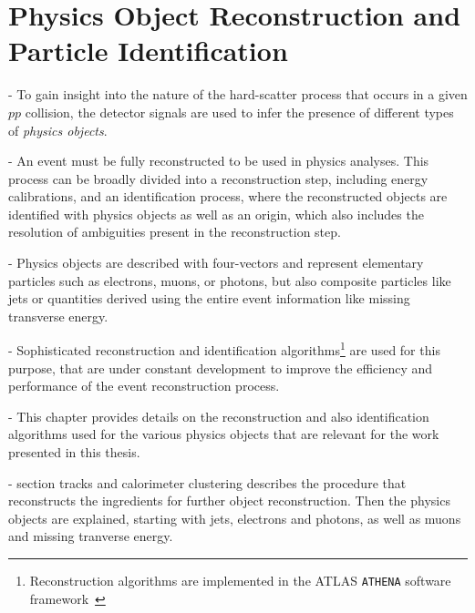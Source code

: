 
\chapter{Physics Object Reconstruction and Particle Identification}
\label{chap:objects}

- To gain insight into the nature of the hard-scatter process that occurs in a given $pp$ collision, the detector signals are used to infer the presence of different types of \emph{physics objects}.

- An event must be fully reconstructed to be used in physics analyses. This process can be broadly divided into a reconstruction step, including energy calibrations, and an identification process, where the reconstructed objects are identified with physics objects as well as an origin, which also includes the resolution of ambiguities present in the reconstruction step.

- Physics objects are described with four-vectors and represent elementary particles such as electrons, muons, or photons, but also composite particles like jets or quantities derived using the entire event information like missing transverse energy.

- Sophisticated reconstruction and identification algorithms\footnote{Reconstruction algorithms are implemented in the ATLAS \texttt{ATHENA} software framework~\cite{ATLAS-TDR-17}} are used for this purpose, that are under constant development to improve the efficiency and performance of the event reconstruction process.

- This chapter provides details on the reconstruction and also identification algorithms used for the various physics objects that are relevant for the work presented in this thesis.

- section tracks and calorimeter clustering describes the procedure that reconstructs the ingredients for further object reconstruction. Then the physics objects are explained, starting with jets, electrons and photons, as well as muons and missing tranverse energy.




